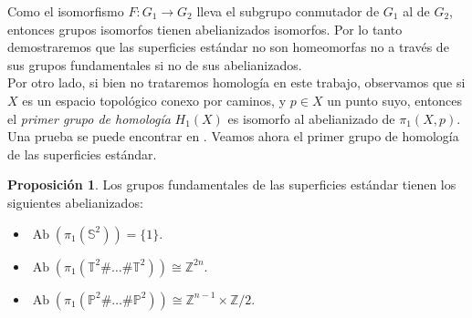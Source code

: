 \documentclass[10pt]{report}
\DeclareMathOperator{\Ab}{Ab}
\newcommand{\Esfera}{\mathbb{S}^2}
\newcommand{\Toro}{\mathbb{T}^2}
\newcommand{\Proyectivo}{\mathbb{P}^2}
\theoremstyle{definition}
\newtheorem{prop}[defin]{Proposición}
\begin{document}
Como el isomorfismo $F:G_1 \to G_2$ lleva el subgrupo conmutador de $G_1$ al de $G_2$, entonces grupos isomorfos tienen abelianizados isomorfos. Por lo tanto demostraremos que las superficies estándar no son homeomorfas no a través de sus grupos fundamentales si no de sus abelianizados.\\
Por otro lado, si bien no trataremos homología en este trabajo, observamos que si $X$ es un espacio topológico conexo por caminos, y $p\in X$ un punto suyo, entonces el \textit{primer grupo de homología} $H_1(X)$ es isomorfo al abelianizado de $\pi_1(X,p)$. Una prueba se puede encontrar en \cite{lee1}. Veamos ahora el primer grupo de homología de las superficies estándar.


\begin{prop}
Los grupos fundamentales de las superficies estándar tienen los siguientes abelianizados:
\begin{itemize}
\item $\Ab{(\pi_1 (\Esfera ))} = \{ 1 \}$.
\item $\Ab{(\pi_1 (\Toro \# \dots \# \Toro ))} \cong \mathbb{Z}^{2n}$.
\item $\Ab{(\pi_1 (\Proyectivo \# \dots \# \Proyectivo ))} \cong \mathbb{Z}^{n-1} \times \mathbb{Z}/2$.
\end{itemize}
\end{prop}
\end{document}
